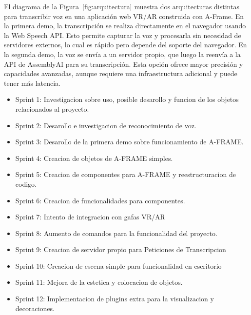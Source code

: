 \documentclass[a4paper, 12pt]{book}
\let\cleardoublepage\clearpage
\begin{document}
El diagrama de la Figura~\ref{fig:arquitectura} muestra dos arquitecturas distintas para transcribir voz en una aplicación web VR/AR construida con A-Frame. En la primera demo, la transcripción se realiza directamente en el navegador usando la Web Speech API. Esto permite capturar la voz y procesarla sin necesidad de servidores externos, lo cual es rápido pero depende del soporte del navegador. En la segunda demo, la voz se envía a un servidor propio, que luego la reenvía a la API de AssemblyAI para su transcripción. Esta opción ofrece mayor precisión y capacidades avanzadas, aunque requiere una infraestructura adicional y puede tener más latencia.




\cleardoublepage

\begin{itemize}
\item Sprint 1: Investigacion sobre uso, posible desarollo y funcion de los objetos relacionados al proyecto.
\item Sprint 2: Desarollo e investigacion de reconocimiento de voz.
\item Sprint 3: Desarollo de la primera demo sobre funcionamiento de A-FRAME.
\item Sprint 4: Creacion de objetos de A-FRAME simples.
\item Sprint 5: Creacion de componentes para A-FRAME y reestructuracion de codigo.
\item Sprint 6: Creacion de funcionalidades para componentes.
\item Sprint 7: Intento de integracion con gafas VR/AR
\item Sprint 8: Aumento de comandos para la funcionalidad del proyecto.
\item Sprint 9: Creacion de servidor propio para Peticiones de Transcripcion
\item Sprint 10: Creacion de escena simple para funcionalidad en escritorio
\item Sprint 11: Mejora de la estetica y colocacion de objetos.
\item Sprint 12: Implementacion de plugins extra para la visualizacion y decoraciones.
\end{itemize}
\end{document}
